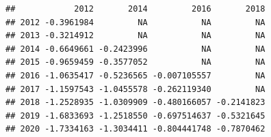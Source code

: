 \documentclass[
]{article}
\begin{document}
\begin{verbatim}
##            2012       2014         2016       2018
## 2012 -0.3961984         NA           NA         NA
## 2013 -0.3214912         NA           NA         NA
## 2014 -0.6649661 -0.2423996           NA         NA
## 2015 -0.9659459 -0.3577052           NA         NA
## 2016 -1.0635417 -0.5236565 -0.007105557         NA
## 2017 -1.1597543 -1.0455578 -0.262119340         NA
## 2018 -1.2528935 -1.0309909 -0.480166057 -0.2141823
## 2019 -1.6833693 -1.2518550 -0.697514637 -0.5321645
## 2020 -1.7334163 -1.3034411 -0.804441748 -0.7870462
\end{verbatim}
\end{document}
